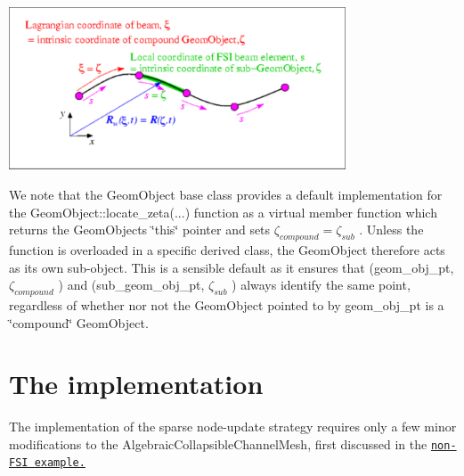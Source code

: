  
\begin{DoxyImage}
\includegraphics[width=0.75\textwidth]{locate_zeta}
\end{DoxyImage}


We note that the {\ttfamily Geom\+Object} base class provides a default implementation for the {\ttfamily Geom\+Object\+::locate\+\_\+zeta}(...) function as a virtual member function which returns the {\ttfamily Geom\+Object\textquotesingle{}s} {\ttfamily \char`\"{}this\char`\"{}} pointer and sets $ \zeta_{compound} = \zeta_{sub} $ . Unless the function is overloaded in a specific derived class, the {\ttfamily Geom\+Object} therefore acts as its own sub-\/object. This is a sensible default as it ensures that ({\ttfamily geom\+\_\+obj\+\_\+pt}, $ \zeta_{compound}$ ) and ({\ttfamily sub\+\_\+geom\+\_\+obj\+\_\+pt}, {\ttfamily $ \zeta_{sub}$} ) always identify the same point, regardless of whether nor not the {\ttfamily Geom\+Object} pointed to by {\ttfamily geom\+\_\+obj\+\_\+pt} is a \char`\"{}compound\char`\"{} {\ttfamily Geom\+Object}.



 

\hypertarget{index_impl}{}\section{The implementation}\label{index_impl}
The implementation of the sparse node-\/update strategy requires only a few minor modifications to the {\ttfamily Algebraic\+Collapsible\+Channel\+Mesh}, first discussed in the \href{../../../navier_stokes/algebraic_collapsible_channel/html/index.html}{\tt non-\/\+F\+SI example.}



